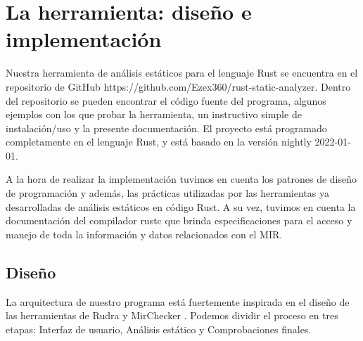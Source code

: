 \chapter{La herramienta: diseño e implementación}

Nuestra herramienta de análisis estáticos para el lenguaje Rust se encuentra en el repositorio de GitHub https://github.com/Ezex360/rust-static-analyzer. Dentro del repositorio se pueden encontrar el código fuente del programa, algunos ejemplos con los que probar la herramienta, un instructivo simple de instalación/uso y la presente documentación.
El proyecto está programado completamente en el lenguaje Rust, y está basado en la versión nightly 2022-01-01.

A la hora de realizar la implementación tuvimos en cuenta los patrones de diseño de programación \cite{ingienieriasoftware} y además, las prácticas utilizadas por las herramientas ya desarrolladas de análisis estáticos en código Rust. A su vez, tuvimos en cuenta la documentación del compilador rustc \cite{rustcdevelopment} que brinda especificaciones para el acceso y manejo de toda la información y datos relacionados con el MIR.

\section{Diseño}

La arquitectura de nuestro programa está fuertemente inspirada en el diseño de las herramientas de Rudra \cite{rudra} y MirChecker \cite{li2021mirchecker}. Podemos dividir el proceso en tres etapas: Interfaz de usuario, Análisis estático y Comprobaciones finales.

